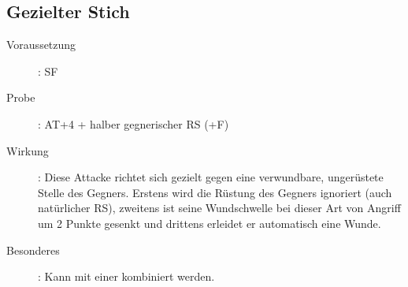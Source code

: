 \subsection{Gezielter Stich}
\label{aktion.gezielter_stich}
\begin{description}
    \item[Voraussetzung]:
        SF 
    \item[Probe]:
        AT+4 + halber gegnerischer RS (+F)
    \item[Wirkung]:
        Diese Attacke richtet sich gezielt gegen eine verwundbare, ungerüstete Stelle des Gegners.
        Erstens wird die Rüstung des Gegners ignoriert (auch natürlicher RS), zweitens ist seine Wundschwelle bei dieser Art von Angriff um 2 Punkte gesenkt und drittens erleidet er automatisch eine Wunde.
    \item[Besonderes]:
        Kann mit einer  kombiniert werden.
\end{description}
